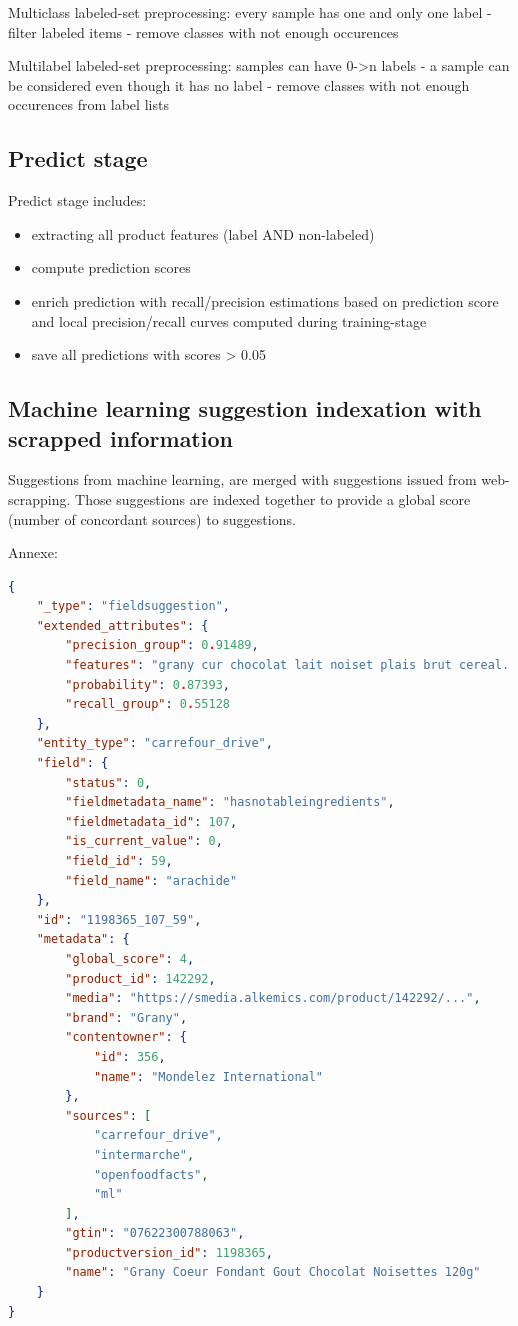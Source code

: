 Multiclass labeled-set preprocessing: every sample has one and only one label
- filter labeled items
- remove classes with not enough occurences

Multilabel labeled-set preprocessing: samples can have 0->n labels
- a sample can be considered even though it has no label
- remove classes with not enough occurences from label lists

\subsection{Predict stage}
Predict stage includes: 
\begin{itemize}
	\item extracting all product features (label AND non-labeled)
	\item compute prediction scores
	\item enrich prediction with recall/precision estimations based on prediction score and local precision/recall curves computed during training-stage
	\item save all predictions with scores > 0.05
\end{itemize}

\subsection{Machine learning suggestion indexation with scrapped information}

Suggestions from machine learning, are merged with suggestions issued from web-scrapping.
Those suggestions are indexed together to provide a global score (number of concordant sources) to suggestions.


Annexe:
\begin{lstlisting}[language=json]
{
    "_type": "fieldsuggestion",
    "extended_attributes": {
        "precision_group": 0.91489,
        "features": "grany cur chocolat lait noiset plais brut cereal...",
        "probability": 0.87393,
        "recall_group": 0.55128
    },
    "entity_type": "carrefour_drive",
    "field": {
        "status": 0,
        "fieldmetadata_name": "hasnotableingredients",
        "fieldmetadata_id": 107,
        "is_current_value": 0,
        "field_id": 59,
        "field_name": "arachide"
    },
    "id": "1198365_107_59",
    "metadata": {
        "global_score": 4,
        "product_id": 142292,
        "media": "https://smedia.alkemics.com/product/142292/...",
        "brand": "Grany",
        "contentowner": {
            "id": 356,
            "name": "Mondelez International"
        },
        "sources": [
            "carrefour_drive",
            "intermarche",
            "openfoodfacts",
            "ml"
        ],
        "gtin": "07622300788063",
        "productversion_id": 1198365,
        "name": "Grany Coeur Fondant Gout Chocolat Noisettes 120g"
    }
}
\end{lstlisting}


